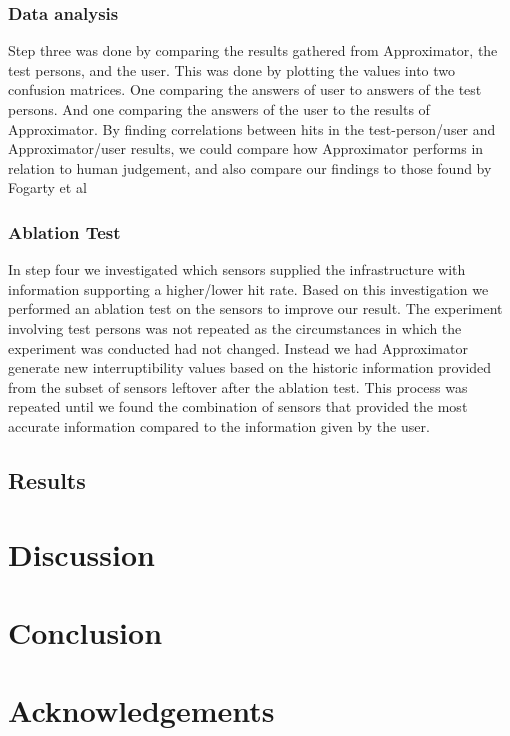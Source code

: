 \documentclass{sigchi}
\begin{document}
\subsubsection{Data analysis}
Step three was done by comparing the results gathered from Approximator, the test persons, and the user.
This was done by plotting the values into two confusion matrices.
One comparing the answers of user to answers of the test persons.
And one comparing the answers of the user to the results of Approximator.
By finding correlations between hits in the test-person/user and Approximator/user results, we could compare how Approximator performs in relation to human judgement, and also compare our findings to those found by Fogarty et al \cite{fogarty2005predicting}

\subsubsection{Ablation Test}
In step four we investigated which sensors supplied the infrastructure with information supporting a higher/lower hit rate.
Based on this investigation we performed an ablation test on the sensors to improve our result.
The experiment involving test persons was not repeated as the circumstances in which the experiment was conducted had not changed.
Instead we had Approximator generate new interruptibility values based on the historic information provided from the subset of sensors leftover after the ablation test.
This process was repeated until we found the combination of sensors that provided the most accurate information compared to the information given by the user.

\subsection{Results}

\section{Discussion}

\section{Conclusion}

\section{Acknowledgements}

\balance



\end{document}
